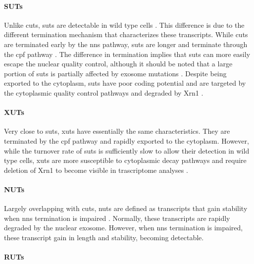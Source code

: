\paragraph{SUTs}

Unlike \gls{cuts}, \gls{suts} are detectable in wild type cells \cite{david:2006:highresolution}.
This difference is due to the different termination mechanism that characterizes these transcripts.
While \gls{cuts} are terminated early by the \gls{nns} pathway, \gls{suts} are longer and terminate through the \gls{cpf} pathway \cite{marquardt:2011:distinct}.
The difference in termination implies that \gls{suts} can more easily escape the nuclear quality control, although it should be noted that a large portion of \gls{suts} is partially affected by exosome mutations \cite{gudipati:2012:extensive, marquardt:2011:distinct}.
Despite being exported to the cytoplasm, \gls{suts} have poor coding potential and are targeted by the cytoplasmic quality control pathways and degraded by Xrn1 \cite{malabat:2015:quality}. 

\paragraph{XUTs}

Very close to \gls{suts}, \gls{xuts} have essentially the same characteristics.
They are terminated by the \gls{cpf} pathway and rapidly exported to the cytoplasm.
However, while the turnover rate of \gls{suts} is sufficiently slow to allow their detection in wild type cells, \gls{xuts} are more susceptible to cytoplasmic decay pathways and require deletion of Xrn1 to become visible in trascriptome analyses \cite{vandijk:2011:xuts}.
  
\paragraph{NUTs}

Largely overlapping with \gls{cuts}, \gls{nuts} are defined as transcripts that gain stability when \gls{nns} termination is impaired \cite{schulz:2013:transcriptome}.
Normally, these transcripts are rapidly degraded by the nuclear exosome.
However, when \gls{nns} termination is impaired, these transcript gain in length and stability, becoming detectable.


\paragraph{RUTs}

